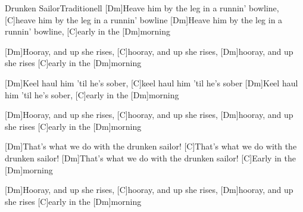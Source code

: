 \documentclass[../main.tex]{subfiles}
\begin{document}
\begin{song}{Drunken Sailor}{Traditionell}{}
[Dm]Heave him by the leg in a runnin' bowline, [C]heave him by the leg in a runnin' bowline
[Dm]Heave him by the leg in a runnin' bowline, [C]early in the [Dm]morning

[Dm]Hooray, and up she rises, [C]hooray, and up she rises, [Dm]hooray, and up she rises [C]early in the [Dm]morning

[Dm]Keel haul him 'til he's sober, [C]keel haul him 'til he's sober
[Dm]Keel haul him 'til he's sober, [C]early in the [Dm]morning

[Dm]Hooray, and up she rises, [C]hooray, and up she rises, [Dm]hooray, and up she rises [C]early in the [Dm]morning

[Dm]That's what we do with the drunken sailor! [C]That's what we do with the drunken sailor!
[Dm]That's what we do with the drunken sailor! [C]Early in the [Dm]morning

[Dm]Hooray, and up she rises, [C]hooray, and up she rises, [Dm]hooray, and up she rises [C]early in the [Dm]morning

\end{song}
\end{document}
